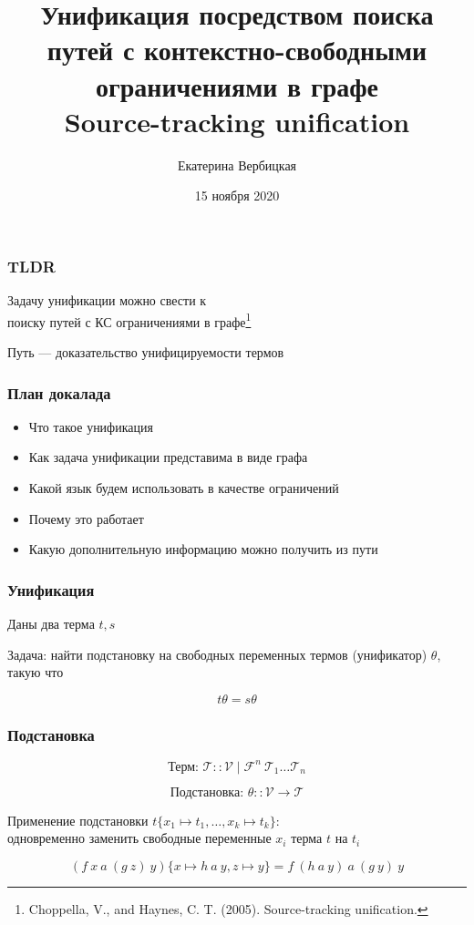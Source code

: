 \documentclass{beamer}
\title[]{Унификация посредством поиска путей с контекстно-свободными ограничениями в графе \\ Source-tracking unification}
\subtitle[]{}
\institute[]{
Лаборатория языковых инструментов JetBrains\\
}
\author[]{Екатерина Вербицкая}
\date{15 ноября 2020}
\begin{document}
{
  \begin{frame}
    \titlepage
  \end{frame}
}


\begin{frame}[fragile]
  \frametitle{TLDR}
\begin{center}
  Задачу унификации можно свести к \\ поиску путей с КС ограничениями в графе\footnote{Choppella, V., and Haynes, C. T. (2005). Source-tracking unification.}

  \bigskip

  Путь --- доказательство унифицируемости термов
\end{center}
\end{frame}

\begin{frame}[fragile]
  \frametitle{План докалада}
\begin{itemize}
  \item Что такое унификация
  \item Как задача унификации представима в виде графа
  \item Какой язык будем использовать в качестве ограничений
  \item Почему это работает
  \item Какую дополнительную информацию можно получить из пути
\end{itemize}

\end{frame}

\begin{frame}[fragile]
  \frametitle{Унификация}

  \begin{center}
    Даны два терма $t, s$
  \end{center}

  \begin{center}
    Задача: найти подстановку на свободных переменных термов (унификатор) $\theta$, такую что
  \end{center}
  \[
    t \theta = s \theta
  \]
\end{frame}


\begin{frame}[fragile]
  \frametitle{Подстановка}
  \[
    \text{Терм: } \mathcal{T} :: \mathcal{V} \mid \mathcal{F}^n \ \mathcal{T}_1 \dots \mathcal{T}_n
  \]

  \[
    \text{Подстановка: } \theta :: \mathcal{V} \to \mathcal{T}
  \]


  \begin{center}
    Применение подстановки $t\{x_1 \mapsto t_1, \dots, x_k \mapsto t_k\}$: \\ одновременно заменить свободные переменные $x_i$ терма $t$ на $t_i$
  \end{center}
  \[
     (f \ x \ a \ (g \ z) \ y)\{x \mapsto h \ a \ y, z \mapsto y\} = f \ (h \ a  \ y) \ a \ (g \ y) \ y
  \]
\end{frame}
\end{document}
